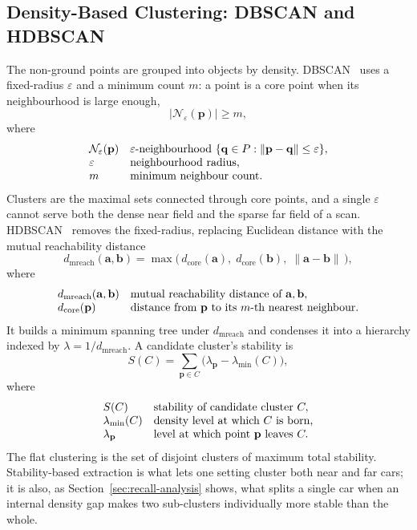 \subsection{Density-Based Clustering: DBSCAN and HDBSCAN}
\label{sec:th-clustering}
The non-ground points are grouped into objects by density. DBSCAN~\cite{ester1996dbscan}
uses a fixed-radius $\varepsilon$ and a minimum count $m$: a point is a core point when its
neighbourhood is large enough,
\begin{equation}
  \lvert \mathcal{N}_\varepsilon(\mathbf{p}) \rvert \ge m ,
  \label{eq:dbscan-core}
\end{equation}
where
\[
  \begin{array}{@{}l@{\quad}l@{}}
    \mathcal{N}_\varepsilon(\mathbf{p}) & \varepsilon\text{-neighbourhood } \{\mathbf{q}\in P : \lVert\mathbf{p}-\mathbf{q}\rVert \le \varepsilon\},\\
    \varepsilon & \text{neighbourhood radius,}\\
    m & \text{minimum neighbour count.}
  \end{array}
\]
Clusters are the maximal sets connected through core points, and a single $\varepsilon$
cannot serve both the dense near field and the sparse far field of a scan.
HDBSCAN~\cite{campello2013hdbscan,mcinnes2017hdbscan} removes the fixed-radius, replacing
Euclidean distance with the mutual reachability distance
\begin{equation}
  d_{\mathrm{mreach}}(\mathbf{a},\mathbf{b}) = \max\!\bigl(\, d_{\mathrm{core}}(\mathbf{a}),\; d_{\mathrm{core}}(\mathbf{b}),\; \lVert\mathbf{a}-\mathbf{b}\rVert \,\bigr),
  \label{eq:mutual-reachability}
\end{equation}
where
\[
  \begin{array}{@{}l@{\quad}l@{}}
    d_{\mathrm{mreach}}(\mathbf{a},\mathbf{b}) & \text{mutual reachability distance of } \mathbf{a},\mathbf{b},\\
    d_{\mathrm{core}}(\mathbf{p}) & \text{distance from } \mathbf{p} \text{ to its } m\text{-th nearest neighbour.}
  \end{array}
\]
It builds a minimum spanning tree under $d_{\mathrm{mreach}}$ and condenses it into a
hierarchy indexed by $\lambda = 1/d_{\mathrm{mreach}}$. A candidate cluster's stability is
\begin{equation}
  S(C) = \sum_{\mathbf{p}\in C} \bigl(\lambda_{\mathbf{p}} - \lambda_{\min}(C)\bigr),
  \label{eq:stability}
\end{equation}
where
\[
  \begin{array}{@{}l@{\quad}l@{}}
    S(C) & \text{stability of candidate cluster } C,\\
    \lambda_{\min}(C) & \text{density level at which } C \text{ is born,}\\
    \lambda_{\mathbf{p}} & \text{level at which point } \mathbf{p} \text{ leaves } C.
  \end{array}
\]
The flat clustering is the set of disjoint clusters of maximum total stability.
Stability-based extraction is what lets one setting cluster both near and far cars; it is
also, as Section~\ref{sec:recall-analysis} shows, what splits a single car when an internal
density gap makes two sub-clusters individually more stable than the whole.

